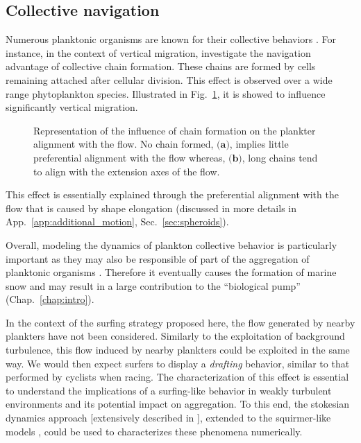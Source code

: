 \subsection{Collective navigation}

Numerous planktonic organisms are known for their collective behaviors \citep{mukherjee2019photosensing, tsang2014flagella}.
For instance, in the context of vertical migration, \citet{lovecchio2019chain} investigate the navigation advantage of collective chain formation.
These chains are formed by cells remaining attached after cellular division.
This effect is observed over a wide range phytoplankton species.
Illustrated in Fig.~\ref{fig:chain_formation}, it is showed to influence significantly vertical migration.
\begin{figure}
    \centering
    \def\svgwidth{0.6\textwidth}
    
    \caption[Representation of the influence of chain formation on the plankter alignment with the flow.]{
    	Representation of the influence of chain formation on the plankter alignment with the flow.
    	No chain formed, $\textbf{(a)}$, implies little preferential alignment with the flow whereas, $\textbf{(b)}$, long chains tend to align with the extension axes of the flow.
    }
    \label{fig:chain_formation}
\end{figure}
This effect is essentially explained through the preferential alignment with the flow that is caused by shape elongation (discussed in more details in App.~\ref{app:additional_motion}, Sec.~\ref{sec:spheroids}).

Overall, modeling the dynamics of plankton collective behavior is particularly important as they may also be responsible of part of the aggregation of planktonic organisms \citep{falgueras2022aggregated}.
Therefore it eventually causes the formation of marine snow and may result in a large contribution to the ``biological pump'' (Chap.~\ref{chap:intro}).

In the context of the surfing strategy proposed here, the flow generated by nearby plankters have not been considered.
Similarly to the exploitation of background turbulence, this flow induced by nearby plankters could be exploited in the same way.
We would then expect surfers to display a \textit{drafting} behavior, similar to that performed by cyclists when racing.
The characterization of this effect is essential to understand the implications of a surfing-like behavior in weakly turbulent environments and its potential impact on aggregation.
To this end, the stokesian dynamics approach [extensively described in \citep{townsend2017mechanics}], extended to the squirmer-like models \citep{ito2019swimming}, could be used to characterizes these phenomena numerically.

